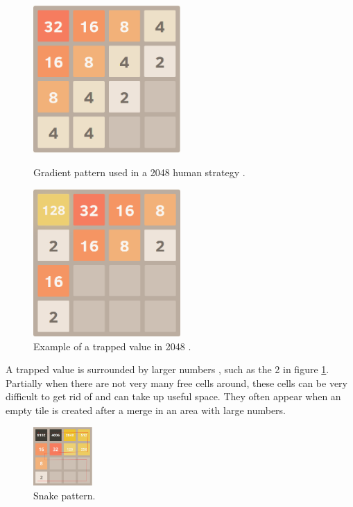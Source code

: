 \documentclass{article}
\begin{document}
\begin{figure}[!tbp]
    \centering
    \begin{minipage}[b]{0.45\textwidth}
        \centering
        \includegraphics[width=0.5\textwidth]{gradient.png}
        \caption{Gradient pattern used in a 2048 human strategy \cite{strategy2048}.}
        \label{fig:gradient}
    \end{minipage}
    \hfill
    \begin{minipage}[b]{0.45\textwidth}
        \centering
        \includegraphics[width=0.5\textwidth]{trapped.png}
        \caption{Example of a trapped value in 2048 \cite{strategy2048}.}
        \label{fig:trap}
    \end{minipage}
\end{figure}
A trapped value is surrounded by larger numbers \cite{strategy2048}, such as the 2 in figure \ref{fig:trap}. Partially when there are not very many free cells around, these cells can be very difficult to get rid of and can take up useful space. They often appear when an empty tile is created after a merge in an area with large numbers. 

\begin{figure}
    \centering
    \includegraphics[width=0.2\textwidth]{bitmap.png}
    \caption{Snake pattern.}
    \label{fig:snake}
\end{figure}
\end{document}
